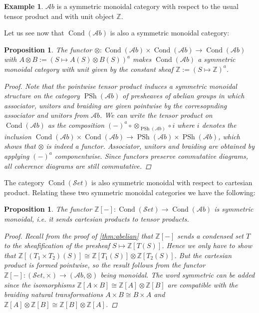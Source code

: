 \documentclass[11pt,A4]{article}
\theoremstyle{plain}
\newtheorem{prop}[thm]{Proposition}
\theoremstyle{definition}
\newtheorem{exa}[thm]{Example}
\theoremstyle{remark}
\newcommand{\Z}{\mathbb{Z}}
\newcommand{\1}{\mathbbm{1}}
\newcommand{\Ab}{\mathscr{A}b}
\newcommand{\Set}{\mathscr{S}et}
\DeclareMathOperator{\Cond}{Cond}
\DeclareMathOperator{\PSh}{PSh}
\newcommand{\ot}{\otimes}
\begin{document}
\begin{exa}
    $\Ab$ is a symmetric monoidal category with respect to the usual tensor product and with unit object $\Z$.
\end{exa}

Let us see now that $\Cond(\Ab)$ is also a symmetric monoidal category:

\begin{prop}\label{prop:sm}
    The functor $\ot\colon \Cond(\Ab)\times \Cond(\Ab)\to \Cond(\Ab)$ with $A\ot B:=(S\mapsto A(S)\ot B(S))^{a}$ makes $\Cond(\Ab)$ a symmetric monoidal category with unit given by the constant sheaf $\Z:=(S\mapsto \Z)^{a}$.
	\begin{proof}
	    Note that the pointwise tensor product induces a symmetric monoidal structure on the category $\PSh(\Ab)$ of presheaves of abelian groups in which associator, unitors and braiding are given pointwise by the corresopnding associator and unitors from $\Ab$.
	    We can write the tensor product on $\Cond(\Ab)$ as the composition $(-)^{a}\circ \ot_{\PSh(\Ab)} \circ i$ where $i$ denotes the inclusion $\Cond(\Ab)\times\Cond(\Ab)\to \PSh(\Ab)\times\PSh(\Ab)$, which shows that $\ot$ is indeed a functor.
	    Associator, unitors and braiding are obtained by applying $(-)^{a}$ componentwise.
	    Since functors preserve commutative diagrams, all coherence diagrams are still commutative.
	\end{proof}
\end{prop}

The category $\Cond(\Set)$ is also symmetric monoidal with respect to cartesian product.
Relating these two symmetric monoidal categories we have the following:

\begin{prop}
    The functor $\Z[-]\colon \Cond(\Set)\to \Cond(\Ab)$ is symmetric monoidal, i.e. it sends cartesian products to tensor products.
    \begin{proof}
	Recall from the proof of \cref{thm:abelian} that $\Z[-]$ sends a condensed set $T$ to the sheafification of the presheaf $S\mapsto \Z[T(S)]$.
	Hence we only have to show that $\Z[(T_{1}\times T_{2})(S)]\cong \Z[T_{1}(S)]\ot \Z[T_{2}(S)]$.
	But the cartesian product is formed pointwise, so the result follows from the functor $\Z[-]\colon (\Set,\times )\to (\Ab,\ot)$ being monoidal.
	The word symmetric can be added since the isomorphisms $\Z[A\times B]\cong \Z[A]\ot\Z[B]$ are compatible with the braiding natural transformations $A\times B\cong B\times A$ and $\Z[A]\ot \Z[B]\cong \Z[B]\ot \Z[A]$.
    \end{proof}
\end{prop}
\end{document}
